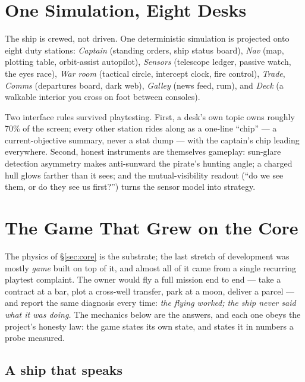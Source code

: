 \documentclass[10pt,twocolumn]{article}
\begin{document}
\section{One Simulation, Eight Desks}
\label{sec:desks}

The ship is crewed, not driven. One deterministic simulation is projected onto eight duty
stations: \emph{Captain} (standing orders, ship status board), \emph{Nav} (map, plotting
table, orbit-assist autopilot), \emph{Sensors} (telescope ledger, passive watch, the eyes
race), \emph{War room} (tactical circle, intercept clock, fire control), \emph{Trade},
\emph{Comms} (departures board, dark web), \emph{Galley} (news feed, rum), and \emph{Deck}
(a walkable interior you cross on foot between consoles).

Two interface rules survived playtesting. First, a desk's own topic owns roughly 70\% of
the screen; every other station rides along as a one-line ``chip'' --- a current-objective
summary, never a stat dump --- with the captain's chip leading everywhere. Second, honest
instruments are themselves gameplay: sun-glare detection asymmetry makes anti-sunward the
pirate's hunting angle; a charged hull glows farther than it sees; and the mutual-visibility
readout (``do we see them, or do they see us first?'') turns the sensor model into strategy.

\section{The Game That Grew on the Core}
\label{sec:game}

The physics of \S\ref{sec:core} is the substrate; the last stretch of development was
mostly \emph{game} built on top of it, and almost all of it came from a single recurring
playtest complaint. The owner would fly a full mission end to end --- take a contract at a
bar, plot a cross-well transfer, park at a moon, deliver a parcel --- and report the same
diagnosis every time: \emph{the flying worked; the ship never said what it was doing.} The
mechanics below are the answers, and each one obeys the project's honesty law: the game
states its own state, and states it in numbers a probe measured.

\subsection{A ship that speaks}
\end{document}
